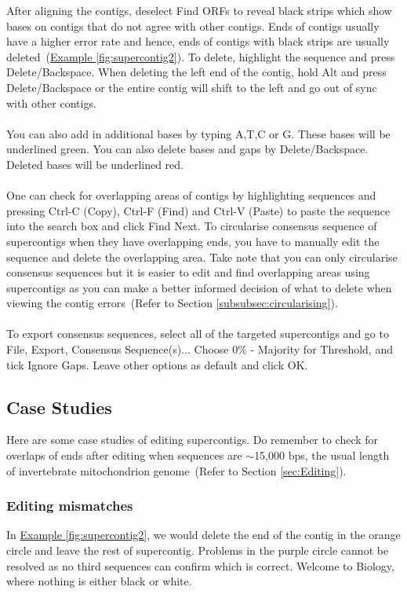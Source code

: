 \documentclass[11pt]{article}
\newcommand{\exautoref}[1]{\hyperref[#1]{Example \ref*{#1}}}
\newcommand{\secref}[1]{(Refer to Section \ref{#1})}
\begin{document}
After aligning the contigs, deselect Find ORFs to reveal black strips which show bases on contigs that do not agree with other contigs. Ends of contigs usually have a higher error rate and hence, ends of contigs with black strips are usually deleted~(\hyperref[fig:supercontig2]{Example \ref*{fig:supercontig2}}). To delete, highlight the sequence and press Delete/Backspace. When deleting the left end of the contig, hold Alt and press Delete/Backspace or the entire contig will shift to the left and go out of sync with other contigs. 
\\
\\
You can also add in additional bases by typing A,T,C or G. These bases will be underlined green. You can also delete bases and gaps by Delete/Backspace. Deleted bases will be underlined red. 
\\
\\
One can check for overlapping areas of contigs by highlighting sequences and pressing Ctrl-C (Copy), Ctrl-F (Find) and Ctrl-V (Paste) to paste the sequence into the search box and click Find Next. To circularise consensus sequence of supercontigs when they have overlapping ends, you have to manually edit the sequence and delete the overlapping area. Take note that you can only circularise consensus sequences but it is easier to edit and find overlapping areas using supercontigs as you can make a better informed decision of what to delete when viewing the contig errors~\secref{subsubsec:circularising}. \\
\\
To export consensus sequences, select all of the targeted supercontigs and go to File, Export, Consensus Sequence(s)... Choose 0$\%$ - Majority for Threshold, and tick Ignore Gaps. Leave other options as default and click OK. 

\subsection{Case Studies}
Here are some case studies of editing supercontigs. Do remember to check for overlaps of ends after editing when sequences are $\sim$15,000 bps, the usual length of invertebrate mitochondrion genome~\secref{sec:Editing}.

\subsubsection{Editing mismatches}
\label{subsubsec:editingmismatches}

In \exautoref{fig:supercontig2}, we would delete the end of the contig in the orange circle and leave the rest of supercontig. Problems in the purple circle cannot be resolved as no third sequences can confirm which is correct. Welcome to Biology, where nothing is either black or white. 
\end{document}

